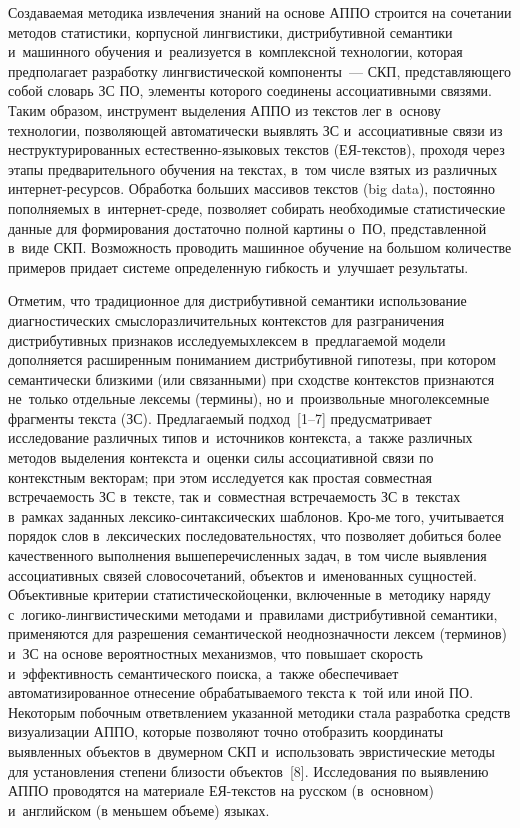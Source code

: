 \begin{multicols}{2}
     Создаваемая методика извлечения знаний на основе АППО строится на
сочетании методов статистики, корпусной лингвистики, дистрибутивной
семантики и~машинного обучения и~реализуется в~комплексной технологии,
которая предполагает разработку лингвистической компоненты~--- СКП,
представляющего собой словарь ЗС ПО, элементы которого соединены ассоциативными связями. Таким
образом, инструмент выделения АППО из текстов лег в~основу технологии,
позволяющей автоматически выявлять ЗС и~ассоциативные связи из
неструктурированных ес\-те\-ст\-вен\-но-язы\-ко\-вых текстов (ЕЯ-текс\-тов),
проходя через этапы предварительного обучения на текстах, в~том числе
взятых из различных ин\-тер\-нет-ре\-сур\-сов. Обработка больших массивов
текстов (big data), постоянно по\-пол\-ня\-емых в~ин\-тер\-нет-сре\-де, позволяет
собирать необходимые статистические данные для формирования достаточно
полной картины о~ПО, представленной в~виде СКП.
Возможность проводить машинное обучение на большом количестве
примеров придает системе определенную гибкость и~улучшает результаты.

     Отметим, что традиционное для дистрибутивной семантики
использование диагностических смыслоразличительных контекстов для
разграничения дистрибутивных признаков ис\-сле\-ду\-емых\linebreak лексем в~предлагаемой модели дополняется расширенным пониманием
дистрибутивной гипотезы, при котором семантически близкими (или
связанными) при сходстве контекстов признаются не~только отдельные
лексемы (термины), но и~произвольные многолексемные фрагменты текста
(ЗС). Предлагаемый подход~[1--7] предусматривает
исследование различных типов и~источников контекста, а~также различных
методов выделения контекста и~оценки силы ассоциативной связи по
контекстным векторам; при этом исследуется как простая совместная
встречаемость ЗС в~тексте, так и~совместная встречаемость ЗС в~текстах в~рамках заданных лек\-си\-ко-син\-так\-си\-че\-ских шаблонов. Кро-\linebreak ме того,
учитывается порядок слов в~лексических последовательностях, что позволяет
добиться более качественного выполнения вышеперечисленных задач, в~том
числе выявления ассоциативных связей словосочетаний, объектов и~именованных сущностей. Объективные критерии статистической\linebreak оценки,
включенные в~методику наряду с~ло\-ги\-ко-линг\-ви\-сти\-че\-ски\-ми методами и~правилами дистрибутивной семантики, применяются для разрешения
семантической неоднозначности лексем (терми\-нов) и~ЗС на основе
вероятностных механизмов, что повышает скорость и~эффективность
семантического поиска, а~также обеспечивает автоматизированное отнесение
обрабатываемого текста к~той или иной ПО. Некоторым
побочным ответвлением указанной методики стала разработка средств
визуализации АППО, которые позволяют точно отобразить координаты
выявленных объектов в~двумерном
СКП и~использовать эвристические методы для установления
степени близости объектов~[8]. Исследования по выявлению АППО
проводятся на материале ЕЯ-текс\-тов на русском (в~основном) и~английском (в меньшем объеме) языках.


\end{multicols}
